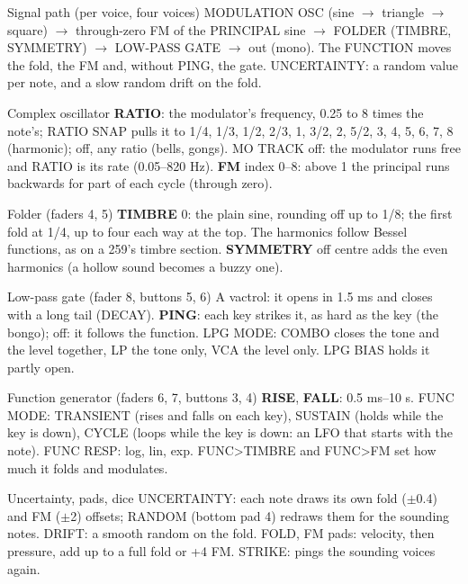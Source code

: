 \documentclass{article}
\newcommand{\OS}[1]{\textcolor{oscc}{#1}}
\newcommand{\FO}[1]{\textcolor{foldc}{#1}}
\newcommand{\FN}[1]{\textcolor{funcc}{#1}}
\newcommand{\LG}[1]{\textcolor{lpgc}{#1}}
\newcommand{\RN}[1]{\textcolor{rndc}{#1}}
\begin{document}
\vspace{1.2mm}
\begin{minipage}[t]{72mm}\vspace{0pt}
\begin{card}{Signal path (per voice, four voices)}
\OS{MODULATION OSC} (sine \(\to\) triangle \(\to\) square) \(\to\) through-zero \OS{FM} of the
\OS{PRINCIPAL} sine \(\to\) \FO{FOLDER} (TIMBRE, SYMMETRY) \(\to\) \LG{LOW-PASS GATE} \(\to\) out
(mono). The \FN{FUNCTION} moves the fold, the FM and, without PING, the gate. \RN{UNCERTAINTY}:
a random value per note, and a slow random drift on the fold.
\end{card}
\begin{card}{Complex oscillator}
\OS{\textbf{RATIO}}: the modulator's frequency, 0.25 to 8 times the note's; \OS{RATIO SNAP} pulls it to
1/4, 1/3, 1/2, 2/3, 1, 3/2, 2, 5/2, 3, 4, 5, 6, 7, 8 (harmonic); off, any ratio (bells, gongs).
\OS{MO TRACK} off: the modulator runs free and RATIO is its rate (0.05--820 Hz).
\OS{\textbf{FM}} index 0--8: above 1 the principal runs backwards for part of each cycle
(through zero).
\end{card}
\end{minipage}\hfill
\begin{minipage}[t]{70mm}\vspace{0pt}
\begin{card}{Folder (faders 4, 5)}
\FO{\textbf{TIMBRE}} 0: the plain sine, rounding off up to 1/8; the first fold at 1/4, up to four each way at the top.
The harmonics follow Bessel functions, as on a 259's timbre section. \FO{\textbf{SYMMETRY}} off
centre adds the even harmonics (a hollow sound becomes a buzzy one).
\end{card}
\begin{card}{Low-pass gate (fader 8, buttons 5, 6)}
A \LG{vactrol}: it opens in 1.5 ms and closes with a long tail (\LG{DECAY}). \LG{\textbf{PING}}: each key
strikes it, as hard as the key (the bongo); off: it follows the \FN{function}. \LG{LPG MODE}: COMBO
closes the tone and the level together, LP the tone only, VCA the level only. \LG{LPG BIAS}
holds it partly open.
\end{card}
\end{minipage}\hfill
\begin{minipage}[t]{66mm}\vspace{0pt}
\begin{card}{Function generator (faders 6, 7, buttons 3, 4)}
\FN{\textbf{RISE}}, \FN{\textbf{FALL}}: 0.5 ms--10 s. \FN{FUNC MODE}: TRANSIENT (rises and falls on
each key), SUSTAIN (holds while the key is down), CYCLE (loops while the key is down: an LFO
that starts with the note). \FN{FUNC RESP}: log, lin, exp. FUNC>TIMBRE and FUNC>FM set how
much it folds and modulates.
\end{card}
\begin{card}{Uncertainty, pads, dice}
\RN{UNCERTAINTY}: each note draws its own fold (\(\pm\)0.4) and FM (\(\pm\)2) offsets; \RN{RANDOM}
(bottom pad 4) redraws them for the sounding notes. \RN{DRIFT}: a smooth random on the fold.
FOLD, FM pads: velocity, then pressure, add up to a full fold or +4 FM. \LG{STRIKE}: pings the
sounding voices again.
\end{card}
\end{minipage}\hfill
\end{document}
